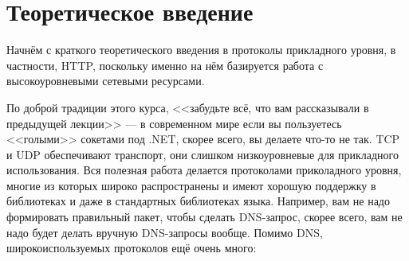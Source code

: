 \documentclass{../../text-style}
\begin{document}
\maketitle
\thispagestyle{empty}

\section{Теоретическое введение}

Начнём с краткого теоретического введения в протоколы прикладного уровня, в частности, HTTP, поскольку именно на нём базируется работа с высокоуровневыми сетевыми ресурсами.

По доброй традиции этого курса, <<забудьте всё, что вам рассказывали в предыдущей лекции>> --- в современном мире если вы пользуетесь <<голыми>> сокетами под .NET, скорее всего, вы делаете что-то не так. TCP и UDP обеспечивают транспорт, они слишком низкоуровневые для прикладного использования. Вся полезная работа делается протоколами приколадного уровня, многие из которых широко распространены и имеют хорошую поддержку в библиотеках и даже в стандартных библиотеках языка. Например, вам не надо формировать правильный пакет, чтобы сделать DNS-запрос, скорее всего, вам не надо будет делать вручную DNS-запросы вообще. Помимо DNS, широкоиспользуемых протоколов ещё очень много:
\end{document}

